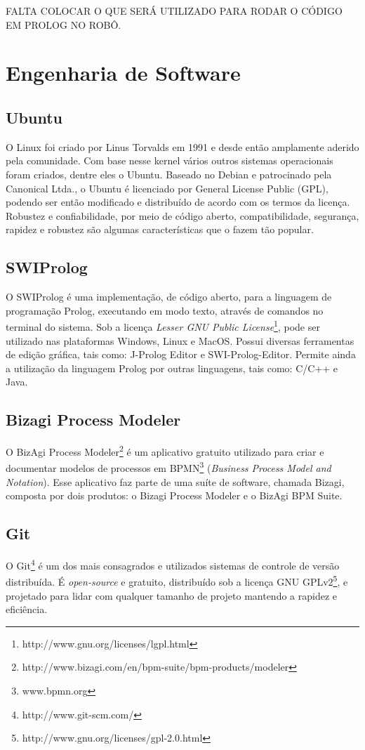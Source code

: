 FALTA COLOCAR O QUE SERÁ UTILIZADO PARA RODAR O CÓDIGO EM PROLOG NO ROBÔ.


\section{Engenharia de Software}
\subsection{Ubuntu}
O Linux foi criado por Linus Torvalds em 1991 \cite{torvalds2001just} e desde então amplamente aderido pela comunidade. Com base nesse kernel vários outros sistemas operacionais foram criados, dentre eles o Ubuntu. 
Baseado no Debian e patrocinado pela Canonical Ltda., o Ubuntu é licenciado por General License Public (GPL), podendo ser então modificado e distribuído de acordo com os termos da licença. Robustez e confiabilidade, por meio de código aberto, compatibilidade, segurança, rapidez e robustez são algumas características que o fazem tão popular. 

\subsection{SWIProlog}
O SWIProlog é uma implementação, de código aberto, para a linguagem de programação Prolog, executando em modo texto, através de comandos no terminal do sistema. Sob a licença \textit{Lesser GNU Public License}\footnote{http://www.gnu.org/licenses/lgpl.html}, pode ser utilizado nas plataformas Windows, Linux e MacOS. Possui diversas ferramentas de edição gráfica, tais como: J-Prolog Editor e SWI-Prolog-Editor.
Permite ainda a utilização da linguagem Prolog por outras linguagens, tais como: C/C++ e Java.

\subsection{Bizagi Process Modeler}
O BizAgi Process Modeler\footnote{http://www.bizagi.com/en/bpm-suite/bpm-products/modeler} é um aplicativo gratuito utilizado para criar e documentar modelos de processos em BPMN\footnote{www.bpmn.org} (\textit{Business Process Model and Notation}). Esse aplicativo faz parte de uma suíte de software, chamada Bizagi, composta por dois produtos: o Bizagi Process Modeler e o BizAgi BPM Suite. 

\subsection{Git}
O Git\footnote{http://www.git-scm.com/} é um dos mais consagrados e utilizados sistemas de controle de versão distribuída. É \textit{open-source} e gratuito, distribuído sob a licença GNU GPLv2\footnote{http://www.gnu.org/licenses/gpl-2.0.html}, e projetado para lidar com qualquer tamanho de projeto mantendo a rapidez e eficiência. 

